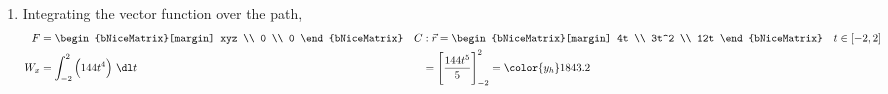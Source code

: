 \begin{enumerate}
    \item Integrating the vector function over the path,
          \begin{align}
              F   & = \begin{bNiceMatrix}[margin]
                          xyz \\ 0 \\ 0
                      \end{bNiceMatrix}              &
              C   & : \vec{r} = \begin{bNiceMatrix}[margin]
                                    4t \\ 3t^2 \\ 12t
                                \end{bNiceMatrix} \quad t \in [-2, 2] \\
              W_x & = \int_{-2}^{2} \Big( 144t^4 \Big)\ \dl t  &
                  & = \Bigg[ \frac{144 t^5}{5} \Bigg]_{-2}^{2}
              = \color{y_h} 1843.2
          \end{align}



\end{enumerate}
